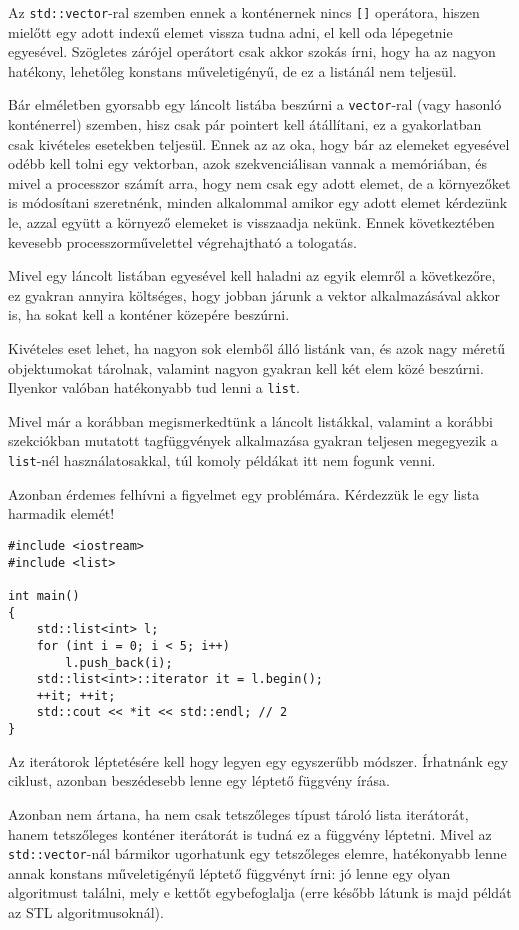 \documentclass[a4paper,11.5pt,table]{article}
\begin{document}
	Az \texttt{std::vector}-ral szemben ennek a konténernek nincs \texttt{[]} operátora, hiszen mielőtt egy adott indexű elemet vissza tudna adni, el kell oda lépegetnie egyesével. Szögletes zárójel operátort csak akkor szokás írni, hogy ha az nagyon hatékony, lehetőleg konstans műveletigényű, de ez a listánál nem teljesül.
	\begin{note}
		Bár elméletben gyorsabb egy láncolt listába beszúrni a \texttt{vector}-ral (vagy hasonló konténerrel) szemben, hisz csak pár pointert kell átállítani, ez a gyakorlatban csak kivételes esetekben teljesül. Ennek az az oka, hogy bár az elemeket egyesével odébb kell tolni egy vektorban, azok szekvenciálisan vannak a memóriában, és mivel a processzor számít arra, hogy nem csak egy adott elemet, de a környezőket is módosítani szeretnénk, minden alkalommal amikor egy adott elemet kérdezünk le, azzal együtt a környező elemeket is visszaadja nekünk. Ennek következtében kevesebb processzorművelettel végrehajtható a tologatás.
		
		Mivel egy láncolt listában egyesével kell haladni az egyik elemről a következőre, ez gyakran annyira költséges, hogy jobban járunk a vektor alkalmazásával akkor is, ha sokat kell a konténer közepére beszúrni.
		
		Kivételes eset lehet, ha nagyon sok elemből álló listánk van, és azok nagy méretű objektumokat tárolnak, valamint nagyon gyakran kell két elem közé beszúrni. Ilyenkor valóban hatékonyabb tud lenni a \texttt{list}.
	\end{note}
	Mivel már a korábban megismerkedtünk a láncolt listákkal, valamint a korábbi szekciókban mutatott tagfüggvények alkalmazása gyakran teljesen megegyezik a \texttt{list}-nél használatosakkal, túl komoly példákat itt nem fogunk venni. 
	
	Azonban érdemes felhívni a figyelmet egy problémára. Kérdezzük le egy lista harmadik elemét!
	\begin{lstlisting}
#include <iostream>
#include <list>

int main()
{
	std::list<int> l;
	for (int i = 0; i < 5; i++)
		l.push_back(i);
	std::list<int>::iterator it = l.begin();
	++it; ++it;
	std::cout << *it << std::endl; // 2
}
	\end{lstlisting}	
	Az iterátorok léptetésére kell hogy legyen egy egyszerűbb módszer. Írhatnánk egy ciklust, azonban beszédesebb lenne egy léptető függvény írása.
	
	Azonban nem ártana, ha nem csak tetszőleges típust tároló lista iterátorát, hanem tetszőleges konténer iterátorát is tudná ez a függvény léptetni. Mivel az \texttt{std::vector}-nál bármikor ugorhatunk egy tetszőleges elemre, hatékonyabb lenne annak konstans műveletigényű léptető függvényt írni: jó lenne egy olyan algoritmust találni, mely e kettőt egybefoglalja (erre később látunk is majd példát az STL algoritmusoknál).
	
\end{document}
